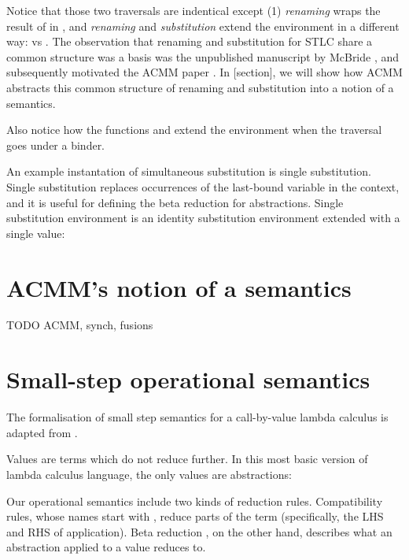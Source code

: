 \documentclass[bsc,frontabs,oneside,singlespacing,parskip,deptreport]{infthesis}
\theoremstyle{definition}
\theoremstyle{lemma}
\begin{document}

Notice that those two traversals are indentical except (1)
\textit{renaming} wraps the result of  in , and
\textit{renaming} and \textit{substitution} extend the environment in
a different way:  vs . The observation that renaming and substitution for STLC share a
common structure was a basis was the unpublished manuscript by McBride
\cite{mcbride2005type}, and subsequently motivated the ACMM paper
\cite{DBLP:conf/cpp/Allais0MM17}. In [section], we will show how ACMM
abstracts this common structure of renaming and substitution into a
notion of a semantics.

Also notice how the functions  and  extend the
environment when the traversal goes under a binder.

An example instantation of simultaneous substitution is single
substitution. Single substitution replaces occurrences of the
last-bound variable in the context, and it is useful for defining the
beta reduction for abstractions. Single substitution environment is an
identity substitution environment extended with a single value:



\section{ACMM's notion of a semantics}

TODO ACMM, synch, fusions

\section{Small-step operational semantics}

The formalisation of small step semantics for a call-by-value lambda
calculus is adapted from \cite{DBLP:conf/sbmf/Wadler18}.

Values are terms which do not reduce further. In this most basic
version of lambda calculus language, the only values are abstractions:


Our operational semantics include two kinds of reduction rules. Compatibility rules, whose
names start with , reduce parts of the term (specifically, the LHS
and RHS of application). Beta reduction , on the other hand,
describes what an abstraction applied to a value reduces to.
\end{document}

